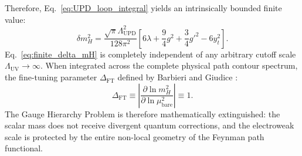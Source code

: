 \documentclass[11pt,a4paper]{article}
\begin{document}
Therefore, Eq.~\eqref{eq:UPD_loop_integral} yields an intrinsically bounded finite value:
\begin{equation}
\delta m_H^2 = \frac{\sqrt{\pi} \Lambda_{\mathrm{UPD}}^2}{128 \pi^2} \left[ 6 \lambda + \frac{9}{4} g^2 + \frac{3}{4} g'^2 - 6 y_t^2 \right].
\label{eq:finite_delta_mH}
\end{equation}
Eq.~\eqref{eq:finite_delta_mH} is completely independent of any arbitrary cutoff scale $\Lambda_{\mathrm{UV}} \to \infty$. When integrated across the complete physical path contour spectrum, the fine-tuning parameter $\Delta_{\mathrm{FT}}$ defined by Barbieri and Giudice \cite{Barbieri1988}:
\begin{equation}
\Delta_{\mathrm{FT}} \equiv \left| \frac{\partial \ln m_H^2}{\partial \ln \mu_{\mathrm{bare}}^2} \right| \equiv 1.
\label{eq:naturalness}
\end{equation}
The Gauge Hierarchy Problem is therefore mathematically extinguished: the scalar mass does not receive divergent quantum corrections, and the electroweak scale is protected by the entire non-local geometry of the Feynman path functional.
\end{document}

